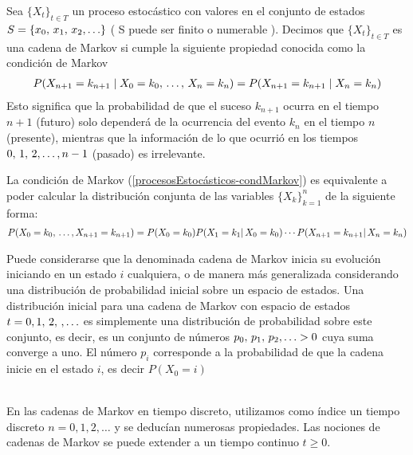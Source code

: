 \begin{Def}
    Sea  $\{X_t\}_{t\in T}$ un proceso estocástico con valores en el conjunto de estados $S=\{x_0,\thinspace x_1,\thinspace x_2 ,\ldots\}$ ( S puede ser finito o numerable ).
    Decimos que $\{X_t\}_{t\in T}$ es una cadena de Markov si cumple la siguiente propiedad conocida como la condición de Markov
    \begin{eqnarray}
    P(X_{n+1}=k_{n+1}\mid  X_{0}=k_0,\thinspace\ldots,\thinspace X_{n}=k_n)=P(X_{n+1}=k_{n+1}\mid X_{n}=k_n)
    \label{procesosEstocásticos-condMarkov}
    \end{eqnarray}
    Esto significa que la probabilidad de que el suceso $k_{n+1}$ ocurra en el tiempo $n+1$ (futuro) solo dependerá de la ocurrencia del evento $k_n$ en el tiempo $n$ (presente), mientras que la información de lo que ocurrió en los tiempos $0,\thinspace 1,\thinspace 2, \ldots,n-1$ (pasado) es irrelevante.
\end{Def}
\begin{Teo}
    La condición de Markov (\ref{procesosEstocásticos-condMarkov}) es equivalente a poder calcular la distribución conjunta de las variables $\{X_k\}_{k=1}^n$ de la siguiente forma:
    \begin{eqnarray}
    \label{procesosEstocásticos-condMarkovEquiv}
    P(X_0= k_0,\thinspace\ldots,X_{n+1}= k_{n+1}) =P(X_0=k_0)P(X_1=k_1|\thinspace X_0=k_0)\cdots P(X_{n+1}=k_{n+1}|\thinspace X_n=k_n)
    \end{eqnarray}
\end{Teo}
Puede considerarse que la denominada cadena de Markov inicia su evolución iniciando en un estado $i$ cualquiera, o de manera más generalizada considerando una
distribución de probabilidad inicial sobre un espacio de estados. Una distribución inicial para una cadena de Markov con espacio de estados $t= 0, 1,\thinspace 2,\thinspace,\ldots  $ es simplemente una distribución de probabilidad sobre este conjunto, es decir,
es un conjunto de números $p_0,\thinspace p_1,\thinspace p_2 ,\ldots >0$ cuya suma converge a uno. El número $p_i$ corresponde a la probabilidad de que la cadena inicie en el estado $i$, es decir $P(X_0= i)$\\ \\
\begin{Obs}
    En las cadenas de Markov en tiempo discreto, utilizamos como índice un tiempo
    discreto $n=0, 1, 2,\ldots$ y se deducían numerosas propiedades.
    Las nociones de cadenas de Markov se puede extender a un tiempo continuo $t \geq 0$.
\end{Obs}
